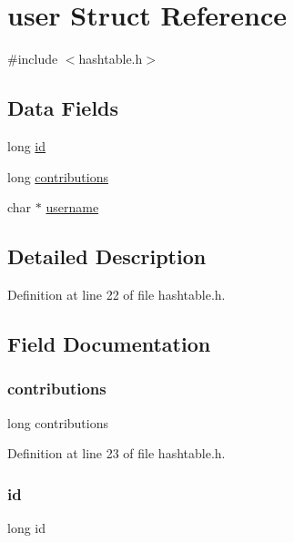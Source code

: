 \hypertarget{structuser}{}\section{user Struct Reference}
\label{structuser}


{\ttfamily \#include $<$hashtable.\+h$>$}

\subsection*{Data Fields}
\begin{DoxyCompactItemize}
\item 
long \hyperlink{structuser_a7350fbd6ad10618f3b750b1f99ca5c3c}{id}
\item 
long \hyperlink{structuser_a3aa2cdc11c71a6b6822316e22857adf9}{contributions}
\item 
char $\ast$ \hyperlink{structuser_a9b20c006bd90a09e1465fb668700e81d}{username}
\end{DoxyCompactItemize}


\subsection{Detailed Description}


Definition at line 22 of file hashtable.\+h.



\subsection{Field Documentation}
\mbox{\label{structuser_a3aa2cdc11c71a6b6822316e22857adf9}} 
\subsubsection{\texorpdfstring{contributions}{contributions}}
{\footnotesize\ttfamily long contributions}



Definition at line 23 of file hashtable.\+h.

\mbox{\label{structuser_a7350fbd6ad10618f3b750b1f99ca5c3c}} 
\subsubsection{\texorpdfstring{id}{id}}
{\footnotesize\ttfamily long id}



